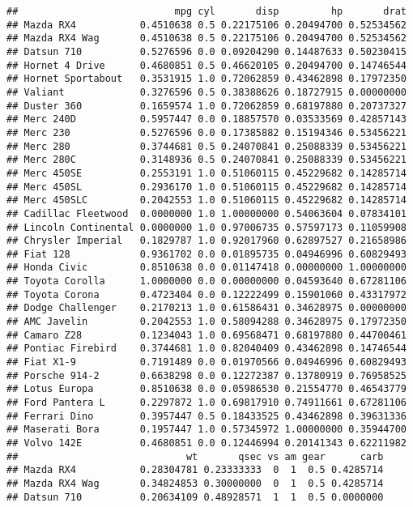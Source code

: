 \documentclass[]{article}
\begin{document}
\begin{verbatim}
##                           mpg cyl       disp         hp       drat
## Mazda RX4           0.4510638 0.5 0.22175106 0.20494700 0.52534562
## Mazda RX4 Wag       0.4510638 0.5 0.22175106 0.20494700 0.52534562
## Datsun 710          0.5276596 0.0 0.09204290 0.14487633 0.50230415
## Hornet 4 Drive      0.4680851 0.5 0.46620105 0.20494700 0.14746544
## Hornet Sportabout   0.3531915 1.0 0.72062859 0.43462898 0.17972350
## Valiant             0.3276596 0.5 0.38388626 0.18727915 0.00000000
## Duster 360          0.1659574 1.0 0.72062859 0.68197880 0.20737327
## Merc 240D           0.5957447 0.0 0.18857570 0.03533569 0.42857143
## Merc 230            0.5276596 0.0 0.17385882 0.15194346 0.53456221
## Merc 280            0.3744681 0.5 0.24070841 0.25088339 0.53456221
## Merc 280C           0.3148936 0.5 0.24070841 0.25088339 0.53456221
## Merc 450SE          0.2553191 1.0 0.51060115 0.45229682 0.14285714
## Merc 450SL          0.2936170 1.0 0.51060115 0.45229682 0.14285714
## Merc 450SLC         0.2042553 1.0 0.51060115 0.45229682 0.14285714
## Cadillac Fleetwood  0.0000000 1.0 1.00000000 0.54063604 0.07834101
## Lincoln Continental 0.0000000 1.0 0.97006735 0.57597173 0.11059908
## Chrysler Imperial   0.1829787 1.0 0.92017960 0.62897527 0.21658986
## Fiat 128            0.9361702 0.0 0.01895735 0.04946996 0.60829493
## Honda Civic         0.8510638 0.0 0.01147418 0.00000000 1.00000000
## Toyota Corolla      1.0000000 0.0 0.00000000 0.04593640 0.67281106
## Toyota Corona       0.4723404 0.0 0.12222499 0.15901060 0.43317972
## Dodge Challenger    0.2170213 1.0 0.61586431 0.34628975 0.00000000
## AMC Javelin         0.2042553 1.0 0.58094288 0.34628975 0.17972350
## Camaro Z28          0.1234043 1.0 0.69568471 0.68197880 0.44700461
## Pontiac Firebird    0.3744681 1.0 0.82040409 0.43462898 0.14746544
## Fiat X1-9           0.7191489 0.0 0.01970566 0.04946996 0.60829493
## Porsche 914-2       0.6638298 0.0 0.12272387 0.13780919 0.76958525
## Lotus Europa        0.8510638 0.0 0.05986530 0.21554770 0.46543779
## Ford Pantera L      0.2297872 1.0 0.69817910 0.74911661 0.67281106
## Ferrari Dino        0.3957447 0.5 0.18433525 0.43462898 0.39631336
## Maserati Bora       0.1957447 1.0 0.57345972 1.00000000 0.35944700
## Volvo 142E          0.4680851 0.0 0.12446994 0.20141343 0.62211982
##                             wt       qsec vs am gear      carb
## Mazda RX4           0.28304781 0.23333333  0  1  0.5 0.4285714
## Mazda RX4 Wag       0.34824853 0.30000000  0  1  0.5 0.4285714
## Datsun 710          0.20634109 0.48928571  1  1  0.5 0.0000000

\end{verbatim}
\end{document}
